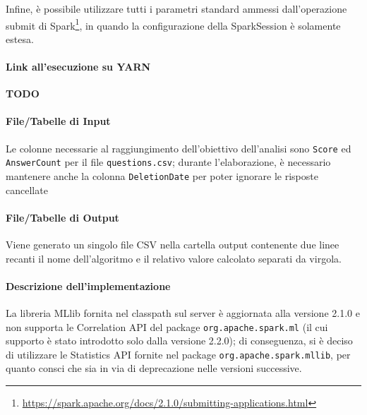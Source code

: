   Infine, è possibile utilizzare tutti i parametri standard ammessi dall'operazione submit di Spark\footnote{\url{https://spark.apache.org/docs/2.1.0/submitting-applications.html}},
  in quando la configurazione della SparkSession è solamente estesa.

  \paragraph{Link all'esecuzione su YARN}\label{par:job3:yarn}

  \textbf{TODO}

  \paragraph{File/Tabelle di Input}\label{par:job3:input}

  Le colonne necessarie al raggiungimento dell'obiettivo dell'analisi sono \texttt{Score} ed \texttt{AnswerCount} per il file \texttt{questions.csv};
  durante l'elaborazione, è necessario mantenere anche la colonna \texttt{DeletionDate} per poter ignorare le risposte cancellate

  \paragraph{File/Tabelle di Output}\label{par:job3:output}

  Viene generato un singolo file CSV nella cartella output contenente due linee recanti il nome dell'algoritmo e il relativo valore calcolato separati da virgola.

  \paragraph{Descrizione dell'implementazione}\label{par:job3:implementation}

  La libreria MLlib fornita nel classpath sul server è aggiornata alla versione 2.1.0 e non supporta le Correlation API del package \texttt{org.apache.spark.ml} (il cui supporto è stato introdotto solo dalla versione 2.2.0);
  di conseguenza, si è deciso di utilizzare le Statistics API fornite nel package \texttt{org.apache.spark.mllib}, per quanto consci che sia in via di deprecazione nelle versioni successive.

